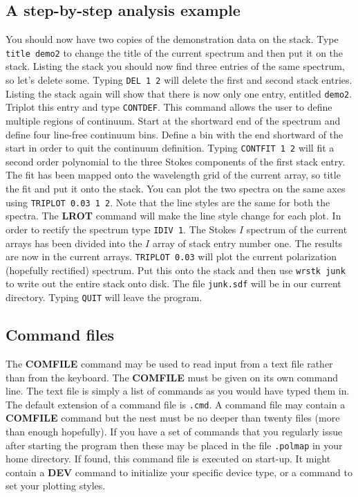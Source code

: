 \documentclass[11pt,nolof,noabs]{starlink}
\begin{document}
\subsection{A step-by-step analysis example}

You should now have two copies of the demonstration data on the
stack. Type \texttt{title demo2} to change the title of the current
spectrum and then put it on the stack. Listing the stack you should
now find three entries of the same spectrum, so let's delete
some. Typing \texttt{DEL 1 2} will delete the first and second stack
entries. Listing the stack again will show that there is now only one
entry, entitled \texttt{demo2}. Triplot this entry and type \texttt{CONTDEF}.  This command allows the user to define multiple regions of
continuum. Start at the shortward end of the spectrum and define four
line-free continuum bins.  Define a bin with the end shortward of the
start in order to quit the continuum definition. Typing \texttt{CONTFIT 1
2} will fit a second order polynomial to the three Stokes components
of the first stack entry. The fit has been mapped onto the wavelength
grid of the current array, so title the fit and put it onto the
stack. You can plot the two spectra on the same axes using \texttt{TRIPLOT 0.03 1 2}. Note that the line styles are the same for both the
spectra. The \textbf{LROT} command will make the line style change for
each plot. In order to rectify the spectrum type \texttt{IDIV 1}. The
Stokes $I$ spectrum of the current arrays has been divided into the
$I$ array of stack entry number one. The results are now in the
current arrays. \texttt{TRIPLOT 0.03} will plot the current polarization
(hopefully rectified) spectrum. Put this onto the stack and then use
\texttt{wrstk junk} to write out the entire stack onto disk. The file
\texttt{junk.sdf} will be in our current directory. Typing \texttt{QUIT}
will leave the program.

\subsection{Command files}

The \textbf{COMFILE} command may be used to read input from a text file
rather than from the keyboard. The \textbf{COMFILE} must be given on its
own command line. The text file is simply a list of commands as you
would have typed them in. The default extension of a command file is
\texttt{.cmd}. A command file may contain a \textbf{COMFILE} command but the
nest must be no deeper than twenty files (more than enough hopefully).
If you have a set of commands that you regularly issue after starting
the program then these may be placed in the file \texttt{.polmap} in your
home directory. If found, this command file is executed on start-up.
It might contain a \textbf{DEV} command to initialize your specific
device type, or a command to set your plotting styles.
\end{document}
